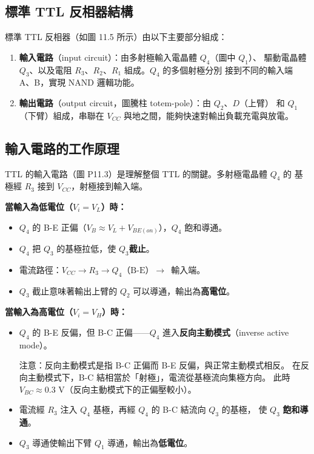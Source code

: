 \documentclass[12pt]{article}
\begin{document}
\subsection*{標準 TTL 反相器結構}

標準 TTL 反相器（如圖 11.5 所示）由以下主要部分組成：

\begin{keybox}
\begin{enumerate}[leftmargin=2em,itemsep=3pt]
\item \textbf{輸入電路}（input circuit）：由多射極輸入電晶體 $Q_4$（圖中 $Q_1$）、
  驅動電晶體 $Q_3$、以及電阻 $R_3$、$R_2$、$R_1$ 組成。$Q_4$ 的多個射極分別
  接到不同的輸入端 A、B，實現 NAND 邏輯功能。
\item \textbf{輸出電路}（output circuit，圖騰柱 totem-pole）：由 $Q_2$、$D$（上臂）
  和 $Q_1$（下臂）組成，串聯在 $V_{CC}$ 與地之間，能夠快速對輸出負載充電與放電。
\end{enumerate}
\end{keybox}

\subsection*{輸入電路的工作原理}

\begin{minipage}{0.58\linewidth}
TTL 的輸入電路（圖 P11.3）是理解整個 TTL 的關鍵。多射極電晶體 $Q_4$ 的
基極經 $R_3$ 接到 $V_{CC}$，射極接到輸入端。

\textbf{當輸入為低電位（$V_i = V_L$）時：}
\begin{itemize}[leftmargin=1.8em,itemsep=1pt]
\item $Q_4$ 的 B-E 正偏（$V_B \approx V_L + V_{BE(on)}$），$Q_4$ 飽和導通。
\item $Q_4$ 把 $Q_3$ 的基極拉低，使 $Q_3$\textbf{截止}。
\item 電流路徑：$V_{CC} \to R_3 \to Q_4\text{（B-E）} \to$~輸入端。
\item $Q_3$ 截止意味著輸出上臂的 $Q_2$ 可以導通，輸出為\textbf{高電位}。
\end{itemize}
\end{minipage}\hfill
\begin{minipage}{0.39\linewidth}
\end{minipage}

\medskip
\textbf{當輸入為高電位（$V_i = V_H$）時：}
\begin{itemize}[leftmargin=1.8em,itemsep=1pt]
\item $Q_4$ 的 B-E 反偏，但 B-C 正偏——$Q_4$ 進入\textbf{反向主動模式}（inverse
  active mode）。

  {\small 注意：反向主動模式是指 B-C 正偏而 B-E 反偏，與正常主動模式相反。
  在反向主動模式下，B-C 結相當於「射極」，電流從基極流向集極方向。
  此時 $V_{BC} \approx 0.3$ V（反向主動模式下的正偏壓較小）。}

\item 電流經 $R_3$ 注入 $Q_4$ 基極，再經 $Q_4$ 的 B-C 結流向 $Q_3$ 的基極，
  使 $Q_3$ \textbf{飽和導通}。
\item $Q_3$ 導通使輸出下臂 $Q_1$ 導通，輸出為\textbf{低電位}。
\end{itemize}
\end{document}
